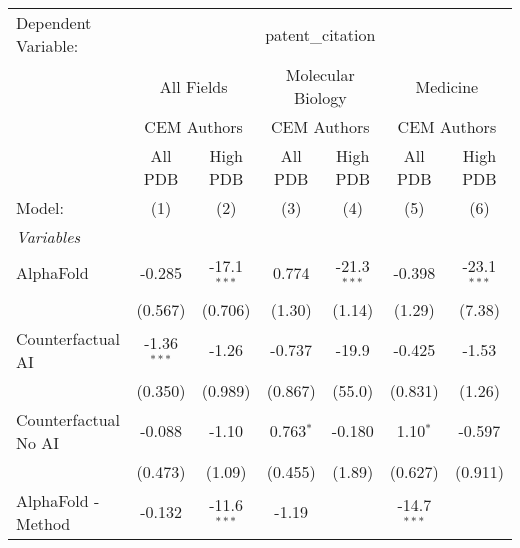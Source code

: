 \begingroup
\centering
\begin{tabular}{lcccccc}
   \tabularnewline \midrule \midrule
   Dependent Variable: & \multicolumn{6}{c}{patent\_citation}\\
 & \multicolumn{2}{c}{All Fields} & \multicolumn{2}{c}{Molecular Biology} & \multicolumn{2}{c}{Medicine} \\
\cmidrule(lr){2-3} \cmidrule(lr){4-5} \cmidrule(lr){6-7}
 & \multicolumn{2}{c}{CEM Authors} & \multicolumn{2}{c}{CEM Authors} & \multicolumn{2}{c}{CEM Authors} \\
\cmidrule(lr){2-3} \cmidrule(lr){4-5} \cmidrule(lr){6-7}
 & \multicolumn{1}{c}{All PDB} & \multicolumn{1}{c}{High PDB} & \multicolumn{1}{c}{All PDB} & \multicolumn{1}{c}{High PDB} & \multicolumn{1}{c}{All PDB} & \multicolumn{1}{c}{High PDB} \\
\cmidrule(lr){2-2} \cmidrule(lr){3-3} \cmidrule(lr){4-4} \cmidrule(lr){5-5} \cmidrule(lr){6-6} \cmidrule(lr){7-7}
   Model:                                                     & (1)           & (2)           & (3)           & (4)           & (5)           & (6)\\  
   \midrule
   \emph{Variables}\\
   AlphaFold                                                  & -0.285        & -17.1$^{***}$ & 0.774         & -21.3$^{***}$ & -0.398        & -23.1$^{***}$\\   
                                                              & (0.567)       & (0.706)       & (1.30)        & (1.14)        & (1.29)        & (7.38)\\   
   Counterfactual AI                                          & -1.36$^{***}$ & -1.26         & -0.737        & -19.9         & -0.425        & -1.53\\   
                                                              & (0.350)       & (0.989)       & (0.867)       & (55.0)        & (0.831)       & (1.26)\\   
   Counterfactual No AI                                       & -0.088        & -1.10         & 0.763$^{*}$   & -0.180        & 1.10$^{*}$    & -0.597\\   
                                                              & (0.473)       & (1.09)        & (0.455)       & (1.89)        & (0.627)       & (0.911)\\   
   AlphaFold - Method                                         & -0.132        & -11.6$^{***}$ & -1.19         &               & -14.7$^{***}$ &   \\   

\end{tabular}
